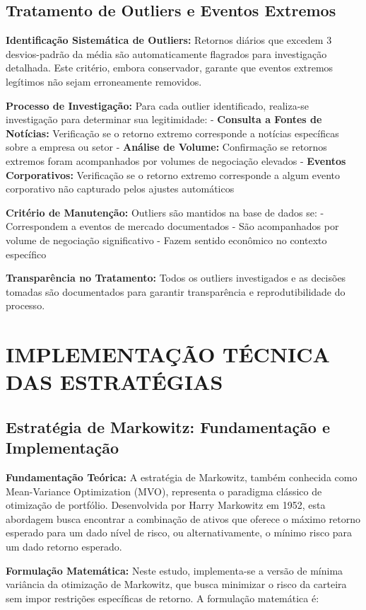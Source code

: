 \subsection{Tratamento de Outliers e Eventos Extremos}

\textbf{Identificação Sistemática de Outliers:} Retornos diários que excedem 3 desvios-padrão da média são automaticamente flagrados para investigação detalhada. Este critério, embora conservador, garante que eventos extremos legítimos não sejam erroneamente removidos.

\textbf{Processo de Investigação:} Para cada outlier identificado, realiza-se investigação para determinar sua legitimidade:
- \textbf{Consulta a Fontes de Notícias:} Verificação se o retorno extremo corresponde a notícias específicas sobre a empresa ou setor
- \textbf{Análise de Volume:} Confirmação se retornos extremos foram acompanhados por volumes de negociação elevados
- \textbf{Eventos Corporativos:} Verificação se o retorno extremo corresponde a algum evento corporativo não capturado pelos ajustes automáticos

\textbf{Critério de Manutenção:} Outliers são mantidos na base de dados se:
- Correspondem a eventos de mercado documentados
- São acompanhados por volume de negociação significativo
- Fazem sentido econômico no contexto específico

\textbf{Transparência no Tratamento:} Todos os outliers investigados e as decisões tomadas são documentados para garantir transparência e reprodutibilidade do processo.

\section{IMPLEMENTAÇÃO TÉCNICA DAS ESTRATÉGIAS}

\subsection{Estratégia de Markowitz: Fundamentação e Implementação}

\textbf{Fundamentação Teórica:} A estratégia de Markowitz, também conhecida como Mean-Variance Optimization (MVO), representa o paradigma clássico de otimização de portfólio. Desenvolvida por Harry Markowitz em 1952, esta abordagem busca encontrar a combinação de ativos que oferece o máximo retorno esperado para um dado nível de risco, ou alternativamente, o mínimo risco para um dado retorno esperado.

\textbf{Formulação Matemática:} Neste estudo, implementa-se a versão de mínima variância da otimização de Markowitz, que busca minimizar o risco da carteira sem impor restrições específicas de retorno. A formulação matemática é:

